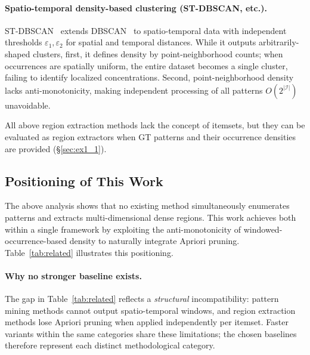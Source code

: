 \paragraph{Spatio-temporal density-based clustering (ST-DBSCAN, etc.).}
ST-DBSCAN~\cite{birant2007stdbscan} extends
DBSCAN~\cite{ester1996dbscan} to spatio-temporal data
with independent thresholds $\varepsilon_1, \varepsilon_2$
for spatial and temporal distances.
While it outputs arbitrarily-shaped clusters,
first, it defines density by point-neighborhood counts;
when occurrences are spatially uniform,
the entire dataset becomes a single cluster,
failing to identify localized concentrations.
Second, point-neighborhood density lacks anti-monotonicity,
making independent processing of all patterns
$O(2^{|\mathcal{I}|})$ unavoidable.

All above region extraction methods lack the concept of itemsets,
but they can be evaluated as region extractors
when GT patterns and their occurrence densities are provided
(\S\ref{sec:ex1_1}).

\subsection{Positioning of This Work}

The above analysis shows that no existing method
simultaneously enumerates patterns
and extracts multi-dimensional dense regions.
This work achieves both within a single framework
by exploiting the anti-monotonicity
of windowed-occurrence-based density
to naturally integrate Apriori pruning.
Table~\ref{tab:related} illustrates this positioning.

\paragraph{Why no stronger baseline exists.}
The gap in Table~\ref{tab:related} reflects a \emph{structural} incompatibility:
pattern mining methods cannot output spatio-temporal windows,
and region extraction methods lose Apriori pruning when applied independently per itemset.
Faster variants within the same categories share these limitations;
the chosen baselines therefore represent each distinct methodological category.

